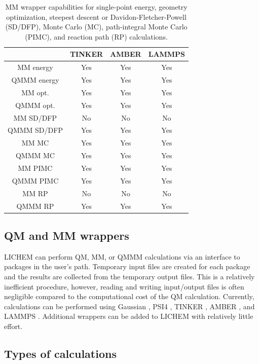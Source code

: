 \documentclass[12pt]{report}
\begin{document}
\begin{table}[hbt]
 \centering
 \begin{tabular}{|c|c c c|}
 \hline
  & TINKER & AMBER & LAMMPS \\ \hline
 MM energy &  Yes & Yes & Yes \\
 QMMM energy & Yes & Yes & Yes \\ \hline
 MM opt. & Yes & Yes & Yes \\
 QMMM opt. & Yes & Yes & Yes \\ \hline
 MM SD/DFP & No & No & No \\
 QMMM SD/DFP & Yes & Yes & Yes \\ \hline
 MM MC & Yes & Yes & Yes \\
 QMMM MC & Yes & Yes & Yes \\ \hline
 MM PIMC & Yes & Yes & Yes \\
 QMMM PIMC & Yes & Yes & Yes \\ \hline
 MM RP & No & No & No \\
 QMMM RP & Yes & Yes & Yes \\ \hline
 \end{tabular}
 \caption{
 MM wrapper capabilities for single-point energy, geometry optimization,
 steepest descent or Davidon-Fletcher-Powell (SD/DFP), Monte Carlo (MC),
 path-integral Monte Carlo (PIMC), and reaction path (RP) calculations.}
 \label{tab:MMWrapCap}
\end{table}

\subsection{QM and MM wrappers}

LICHEM can perform QM, MM, or QMMM calculations via an interface to packages
in the user's path.
Temporary input files are created for each package and the results are
collected from the temporary output files.
This is a relatively inefficient procedure, however, reading and writing
input/output files is often negligible compared to the computational cost of
the QM calculation.
Currently, calculations can be performed using Gaussian \cite{Frisch2009},
PSI4 \cite{Turney2012}, TINKER \cite{Ponder2015}, AMBER \cite{Case2015}, and
LAMMPS \cite{Plimpton1995}.
Additional wrappers can be added to LICHEM with relatively little effort.

\subsection{Types of calculations}
\end{document}
